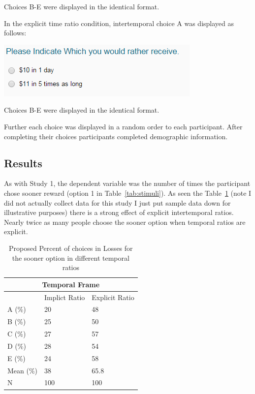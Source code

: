 \documentclass[]{article}
\begin{document}
Choices B-E were displayed in the identical format. 

In the explicit time ratio condition, intertemporal choice A was displayed as follows:

\includegraphics[]{study2_explicit}

Choices B-E were displayed in the identical format. 

Further each choice was displayed in a random order to each participant. 
After completing their choices participants completed demographic information.


\subsection{Results}

As with Study 1, the dependent variable was the number of times the participant chose sooner reward (option 1 in Table~\ref{tab:stimuli}). 
As seen the Table~\ref{tab:study2results} (note I did not actually collect data for this study I just put sample data down for illustrative purposes) there is a strong effect of explicit intertemporal ratios. 
Nearly twice as many people choose the sooner option when temporal ratios are explicit.


\begin{table}[!ht]
	\caption{Proposed Percent of choices in Losses for the sooner option in different temporal ratios} 
	\label{tab:study2results}
	\begin{tabular}{ p{3cm}||p{3cm}|p{3cm}  }
		\multicolumn{3}{|c|}{Temporal Frame} \\
		\hline
		& Implict Ratio & Explicit Ratio\\
		\hline
		A (\%)	 & 20  & 48\\
		B (\%) 	 & 25  & 50\\
		C (\%) 	 & 27  & 57\\
		D (\%)   & 28  & 54\\
		E (\%)   & 24  & 58\\
		Mean (\%) & 38  & 65.8 \\
		N  	 & 100  & 100\\
		\hline
		
	\end{tabular}
\end{table}
\end{document}
